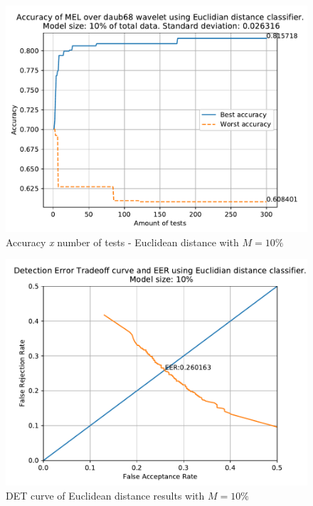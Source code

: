 		\begin{figure}[H]
			\centering
			\includegraphics[scale=.8]{images/results/confusionMatrices/classifier_Euclidian_10.pdf}
			\caption{Accuracy \textit{x} number of tests - Euclidean distance with $M=10\%$}
			\label{fig:classifiereuclidian10}
		\end{figure}
		\begin{figure}[H]
			\centering
			\includegraphics[scale=.8]{images/results/det/DET_for_classifier_Euclidian_10.pdf}
			\caption{DET curve of Euclidean distance results with $M=10\%$}
			\label{fig:detforclassifiereuclidian10}
		\end{figure}
	
